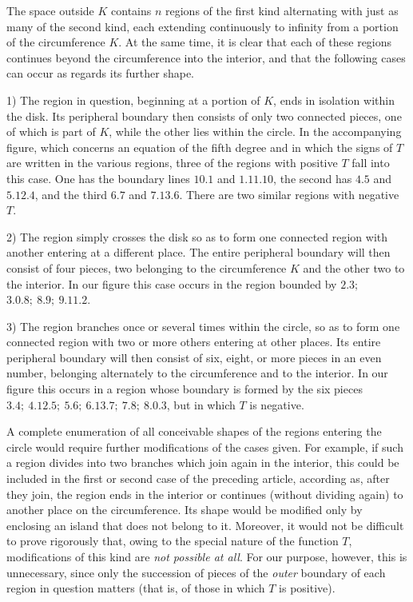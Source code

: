 The space outside $K$ contains $n$ regions of the first kind alternating with just as many of the second kind, each extending continuously to infinity from a portion of the circumference $K$. At the same time, it is clear that each of these regions continues beyond the circumference into the interior, and that the following cases can occur as regards its further shape.

1) The region in question, beginning at a portion of $K$, ends in isolation within the disk. Its peripheral boundary then consists of only two connected pieces, one of which is part of $K$, while the other lies within the circle. In the accompanying figure, which concerns an equation of the fifth degree and in which the signs of $T$ are written in the various regions, three of the regions with positive $T$ fall into this case. One has the boundary lines $10.1$ and $1.11.10$, the second has $4.5$ and $5.12.4$, and the third $6.7$ and $7.13.6$. There are two similar regions with negative $T$.

2) The region simply crosses the disk so as to form one connected region with another entering at a different place. The entire peripheral boundary will then consist of four pieces, two belonging to the circumference $K$ and the other two to the interior. In our figure this case occurs in the region bounded by $2.3;$ $3.0.8;\ 8.9;\ 9.11.2$.

3) The region branches once or several times within the circle, so as to form one connected region with two or more others entering at other places. Its entire peripheral boundary will then consist of six, eight, or more pieces in an even number, belonging alternately to the circumference and to the interior. In our figure this occurs in a region whose boundary is formed by the six pieces $3.4;\ 4.12.5;\ 5.6;\ 6.13.7;\ 7.8;\ 8.0.3$, but in which $T$ is negative.


A complete enumeration of all conceivable shapes of the regions entering the circle would require further modifications of the cases given. For example, if such a region divides into two branches which join again in the interior, this could be included in the first or second case of the preceding article, according as, after they join, the region ends in the interior or continues (without dividing again) to another place on the circumference. Its shape would be modified only by enclosing an island that does not belong to it. Moreover, it would not be difficult to prove rigorously that, owing to the special nature of the function $T$, modifications of this kind are \emph{not possible at all}. For our purpose, however, this is unnecessary, since only the succession of pieces of the \emph{outer} boundary of each region in question matters (that is, of those in which $T$ is positive).

